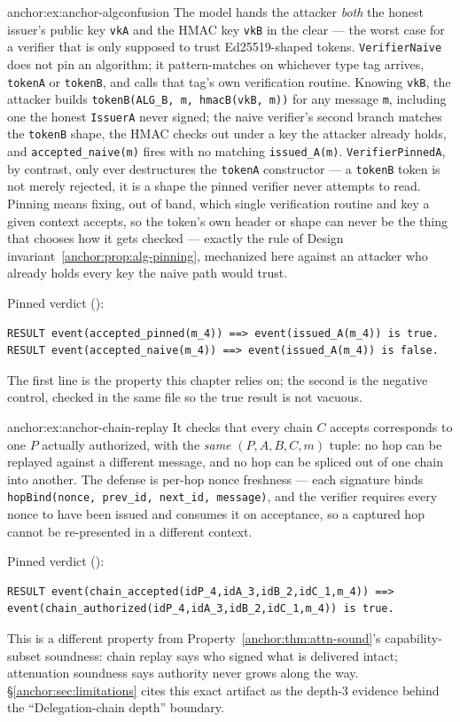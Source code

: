\begin{pdSolution}{anchor:ex:anchor-algconfusion}
The model hands the attacker \emph{both} the honest issuer's public key \texttt{vkA} and the HMAC key \texttt{vkB} in the clear --- the worst case for a verifier that is only supposed to trust Ed25519-shaped tokens. \texttt{VerifierNaive} does not pin an algorithm; it pattern-matches on whichever type tag arrives, \texttt{tokenA} or \texttt{tokenB}, and calls that tag's own verification routine. Knowing \texttt{vkB}, the attacker builds \texttt{tokenB(ALG\_B, m, hmacB(vkB, m))} for any message \texttt{m}, including one the honest \texttt{IssuerA} never signed; the naive verifier's second branch matches the \texttt{tokenB} shape, the HMAC checks out under a key the attacker already holds, and \texttt{accepted\_naive(m)} fires with no matching \texttt{issued\_A(m)}. \texttt{VerifierPinnedA}, by contrast, only ever destructures the \texttt{tokenA} constructor --- a \texttt{tokenB} token is not merely rejected, it is a shape the pinned verifier never attempts to read. Pinning means fixing, out of band, which single verification routine and key a given context accepts, so the token's own header or shape can never be the thing that chooses how it gets checked --- exactly the rule of Design invariant~\ref{anchor:prop:alg-pinning}, mechanized here against an attacker who already holds every key the naive path would trust.

Pinned verdict ():
\begin{lstlisting}
RESULT event(accepted_pinned(m_4)) ==> event(issued_A(m_4)) is true.
RESULT event(accepted_naive(m_4)) ==> event(issued_A(m_4)) is false.
\end{lstlisting}
The first line is the property this chapter relies on; the second is the negative control, checked in the same file so the true result is not vacuous.
\end{pdSolution}
\begin{pdSolution}{anchor:ex:anchor-chain-replay}
It checks that every chain $C$ accepts corresponds to one $P$ actually authorized, with the \emph{same} $(P,A,B,C,m)$ tuple: no hop can be replayed against a different message, and no hop can be spliced out of one chain into another. The defense is per-hop nonce freshness --- each signature binds \texttt{hopBind(nonce, prev\_id, next\_id, message)}, and the verifier requires every nonce to have been issued and consumes it on acceptance, so a captured hop cannot be re-presented in a different context.

Pinned verdict ():
\begin{lstlisting}
RESULT event(chain_accepted(idP_4,idA_3,idB_2,idC_1,m_4)) ==> event(chain_authorized(idP_4,idA_3,idB_2,idC_1,m_4)) is true.
\end{lstlisting}
This is a different property from Property~\ref{anchor:thm:attn-sound}'s capability-subset soundness: chain replay says who signed what is delivered intact; attenuation soundness says authority never grows along the way. \S\ref{anchor:sec:limitations} cites this exact artifact as the depth-3 evidence behind the ``Delegation-chain depth'' boundary.
\end{pdSolution}
